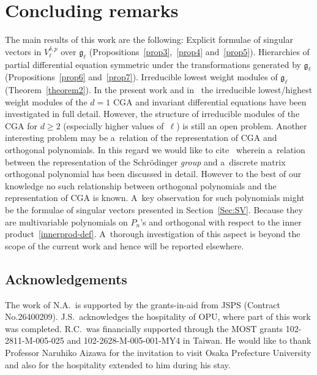 \documentclass[pdftex]{sigma}
\numberwithin{equation}{section}
\begin{document}
\section{Concluding remarks}

The main results of this work are the following: Explicit formulae of singular vectors in $V^{\delta,p}_{\ell}$ over
${\mathfrak g}_{\ell}$ (Propositions~\ref{prop3},~\ref{prop4} and~\ref{prop5}).
Hierarchies of partial dif\/ferential equation symmetric under the transformations generated by $ {\mathfrak g}_{\ell} $
(Propositions~\ref{prop6} and~\ref{prop7}).
Irreducible lowest weight modules of $ {\mathfrak g}_{\ell} $ (Theorem~\ref{theorem2}).
In the present work and in~\cite{AiIsKi,AiKimSeg,LuMazoZhao} the irreducible lowest/highest weight modules of the $ d=1
$ CGA and invariant dif\/ferential equations have been investigated in full detail.
However, the structure of irreducible modules of the CGA for $ d \geq 2 $ (especially higher values of~$\ell$) is still
an open problem.
Another interesting problem may be a~relation of the representation of CGA and orthogonal polynomials.
In this regard we would like to cite~\cite{VineZheda} wherein a~relation between the representation of the Schr\"odinger
\textit{group} and a~discrete matrix orthogonal polynomial has been discussed in detail.
However to the best of our knowledge no such relationship between orthogonal polynomials and the representation of CGA
is known.
A~key observation for such polynomials might be the formulae of singular vectors presented in Section~\ref{Sec:SV}.
Because they are multivariable polynomials on $ P_n$'s and orthogonal with respect to the inner
product~\eqref{innerprod-def}.
A~thorough investigation of this aspect is beyond the scope of the current work and hence will be reported elsewhere.

\vspace{-1.5mm}

\subsection*{Acknowledgements}

\vspace{-1mm}

The work of N.A.~is supported by the grants-in-aid from JSPS (Contract No.26400209).
J.S.~acknowledges the hospitality of OPU, where part of this work was completed.
R.C.~was f\/inancially supported through the MOST grants 102-2811-M-005-025 and 102-2628-M-005-001-MY4 in Taiwan.
He would like to thank Professor Naruhiko Aizawa for the invitation to visit Osaka Prefecture University and also for
the hospitality extended to him during his stay.
\end{document}
